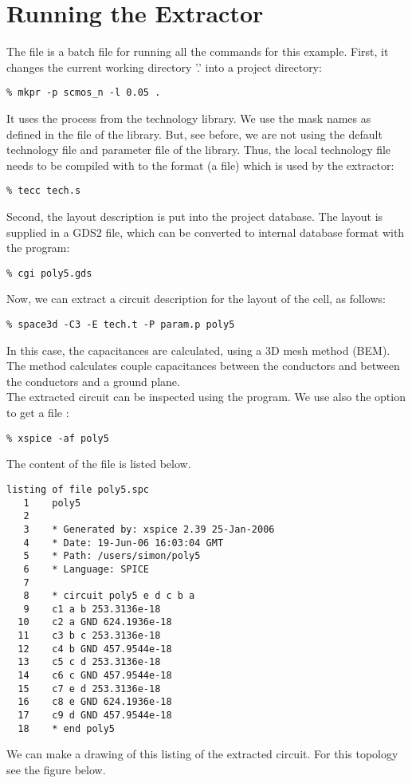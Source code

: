 \section{Running the Extractor}
The file  is a batch file for running all the commands
for this example.
First, it changes the current working directory '.' into a project directory:
\small
\begin{Verbatim}
% mkpr -p scmos_n -l 0.05 .
\end{Verbatim}
\normalsize
It uses the  process from the technology library.
We use the mask names as defined in the  file of the library.
But, see before, we are not using the default technology
file  and parameter file  of the library.
Thus, the local technology file  needs to be compiled with  to the format
(a  file) which is used by the extractor:
\small
\begin{Verbatim}
% tecc tech.s
\end{Verbatim}
\normalsize
Second, the layout description is put into the project database.
The layout is supplied in a GDS2 file, which can be converted to
internal database format with the  program:
\small
\begin{Verbatim}
% cgi poly5.gds
\end{Verbatim}
\normalsize
Now, we can extract a circuit description for the layout of the  cell, as follows:
\small
\begin{Verbatim}
% space3d -C3 -E tech.t -P param.p poly5
\end{Verbatim}
\normalsize
In this case, the capacitances are calculated, using a 3D mesh method (BEM).
The method calculates couple capacitances between the conductors and between the conductors
and a ground plane.
\\[1 ex]
The extracted circuit can be inspected using the  program.
We use also the  option to get a file :
\small
\begin{Verbatim}
% xspice -af poly5
\end{Verbatim}
\normalsize
The content of the file is listed below.

\small \begin{Verbatim}[frame=single]
listing of file poly5.spc
   1    poly5
   2
   3    * Generated by: xspice 2.39 25-Jan-2006
   4    * Date: 19-Jun-06 16:03:04 GMT
   5    * Path: /users/simon/poly5
   6    * Language: SPICE
   7
   8    * circuit poly5 e d c b a
   9    c1 a b 253.3136e-18
  10    c2 a GND 624.1936e-18
  11    c3 b c 253.3136e-18
  12    c4 b GND 457.9544e-18
  13    c5 c d 253.3136e-18
  14    c6 c GND 457.9544e-18
  15    c7 e d 253.3136e-18
  16    c8 e GND 624.1936e-18
  17    c9 d GND 457.9544e-18
  18    * end poly5
\end{Verbatim}
\normalsize
We can make a drawing of this listing of the extracted circuit.
For this topology see the figure below.

